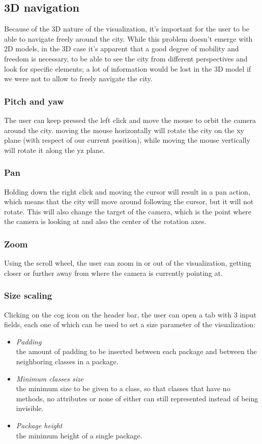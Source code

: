 \documentclass[]{usiinfbachelorproject}
\begin{document}
\subsection{3D navigation} \label{3D navigation}
Because of the 3D nature of the visualization, it's important for the user to be able to navigate freely around the city. While this problem doesn't emerge with 2D models, in the 3D case it's apparent that a good
degree of mobility and freedom is necessary, to be able to see the city from different perspectives and look for specific elements; a lot of information would be lost in the 3D model if we were not to allow to freely navigate the city.


\subsubsection{Pitch and yaw} \label{Pitch and yaw}
The user can keep pressed the left click and move the mouse to orbit the camera around the city. moving the mouse horizontally will rotate the city on the xy plane (with respect of our current position), while
moving the mouse vertically will rotate it along the yz plane.

\subsubsection{Pan} \label{Pan}
Holding down the right click and moving the cursor will result in a pan action, which means that the city will move around following the cursor, but it will not rotate. This will also change the target of the camera,
 which is the point where the camera is looking at and also the center of the rotation axes.

 \subsubsection{Zoom} \label{Zoom}
Using the scroll wheel, the user can zoom in or out of the visualization, getting closer or further away from where the camera is currently pointing at.

\subsubsection{Size scaling} \label{Size scaling}
Clicking on the cog icon on the header bar, the user can open a tab with 3 input fields, each one of which can be used to set a size parameter of the visualization:

\begin{itemize}
\item \textit{Padding}\\ the amount of padding to be inserted between each package and between the neighboring classes in a package.
\item \textit{Minimum classes size}\\ the minimum size to be given to a class, so that classes that have no methods, no attributes or none of either can still represented instead of being invisible.
\item \textit{Package height}\\ the minimum height of a single package.
\end{itemize}
\end{document}
